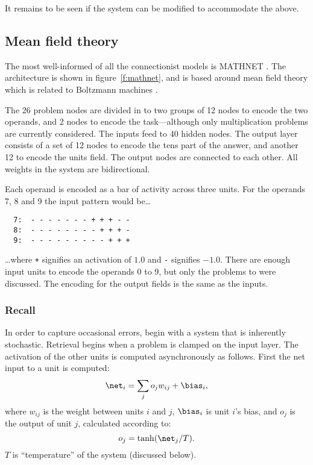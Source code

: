 It remains to be seen if the system can be modified to accommodate the
above.





\subsection{Mean field theory}

The most well-informed of all the connectionist models is
 MATHNET \cite{mcclmath}.  The architecture is
shown in figure~\ref{f:mathnet}, and is based around mean field theory
\cite[chapter~2]{hertintr} which is related to Boltzmann machines
\cite{pdp:7}.

The 26 problem nodes are divided in to
two groups of 12 nodes to encode the two operands, and 2 nodes to encode
the task---although only multiplication problems are currently considered.
The inputs
feed to 40 hidden nodes. The output layer consists of a set of 12 nodes to
encode the tens part of the answer, and another 12 to encode the
units field.
The output nodes are connected to each other. All weights in the
system are bidirectional.

Each operand is encoded as a bar of activity across three units. For the
operands 7, 8 and 9 the input pattern would be\ldots
\begin{verbatim}
  7:  - - - - - - - + + + - -
  8:  - - - - - - - - + + + -
  9:  - - - - - - - - - + + +
\end{verbatim}
\noindent\ldots where \verb|+| signifies an activation of $1.0$ and
\verb|-| signifies $-1.0$.  There are enough input units to encode the
operands 0 to 9, but only the problems  to  were discussed.
The encoding for the output fields is the same as the inputs.

\subsubsection{Recall}

In order to capture occasional errors, \citeauthor{mcclmath} begin with a
system that is inherently stochastic.  Retrieval begins when a problem is
clamped on the input layer.  The activation of the other units is computed
asynchronously as follows.  First the net input to a unit is computed:
$$ \net_i = \sum\limits_j o_jw_{ij} + \bias_i, $$
\noindent where $w_{ij}$ is the weight between units $i$ and $j$, $\bias_i$
is unit $i$'s bias, and $o_j$ is the output of unit $j$, calculated
according to:
$$ o_j = \tanh (\net_j / T). $$
$T$ is ``temperature'' of the system (discussed below).


